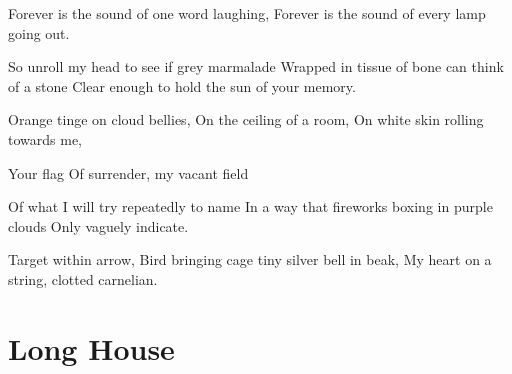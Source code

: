 \documentclass[english,11pt,letterpaper,onecolumn,parskip=full]{scrbook}
\begin{document}
\begin{poem}
\begin{stanza}
Forever is the sound of one word laughing,\verseline
Forever is the sound of every lamp going out.
\end{stanza}

\begin{stanza}
So unroll my head to see if grey marmalade\verseline
Wrapped in tissue of bone can think of a stone\verseline
Clear enough to hold the sun of your memory.
\end{stanza}

\begin{stanza}
Orange tinge on cloud bellies,\verseline
On the ceiling of a room,\verseline
On white skin rolling towards me,
\end{stanza}

\begin{stanza}
Your flag \verseline
Of surrender, my vacant field
\end{stanza}

\begin{stanza}
Of what I will try repeatedly to name\verseline
In a way that fireworks boxing in purple clouds\verseline
Only vaguely indicate.
\end{stanza}

\begin{stanza}
Target within arrow,\verseline
Bird bringing cage tiny silver bell in beak,\verseline
My heart on a string, clotted carnelian.
\end{stanza}
\end{poem}

\newpage
\section{Long House}
\end{document}
